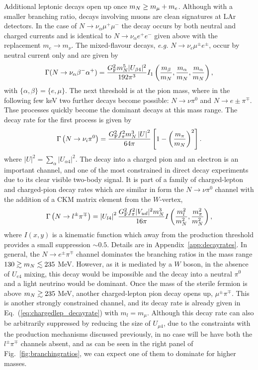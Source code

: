 \documentclass[11pt, a4paper]{article}
\newcommand{\refeq}[1]{Eq.~(\ref{#1})}
\newcommand{\reffig}[1]{Fig.~\ref{#1}}
\newcommand{\refapp}[1]{Appendix~\ref{#1}}
\def\ster{\ensuremath N}
\begin{document}
Additional leptonic decays open up once $m_\ster \geq m_\mu+m_e$. Although with
a smaller branching ratio, decays involving muons are clean signatures at LAr
detectors. In the case of $N\rightarrow \nu_\alpha \mu^+ \mu^-$ the decay
occurs by both neutral and charged currents and is identical to $N\rightarrow
\nu_\alpha e^+ e^-$ given above with the replacement $m_e \rightarrow m_\nu$.
The mixed-flavour decays, \emph{e.g.} $N\rightarrow \nu_e \mu^\pm e^\pm$, occur
by neutral current only and are given by 
%
\[ \Gamma(\ster\to\nu_{\alpha} \beta^- \alpha^+) = \frac{G_\text{F}^2m_\ster^5
|U_{\beta 4}|^2}{192 \pi^3} I_1\left(\frac{m_\beta}{m_N},\frac{ m_\alpha}{m_N},
\frac{ m_\alpha}{m_N} \right) , \] 
%
with $\{\alpha,\beta\} = \{e, \mu\}$. The next threshold is at the pion mass,
where in the following few keV two further decays become possible: $N\to\nu
\pi^0$ and $N\to e\pm\pi^\mp$. Thse processes quickly become the dominant
decays at this mass range. 
%
The decay rate for the first process is given by
%
\[ \Gamma\left(\ster \to \nu_i \pi^0\right) =
\frac{G_\text{F}^2f_\pi^2m_\ster^3\left|U\right|^2}{64\pi} \left[1-\left(
\frac{m_\pi}{m_\ster} \right)^2\right].  \]
%
where $\left|U\right|^2 = \sum_{\alpha}\left|U_{\alpha 4}\right|^2$.
%
The decay into a charged pion and an electron is an important channel, and one
of the most constrained in direct decay experiments due to its clear visible
two-body signal.  It is part of a family of charged-lepton and charged-pion
decay rates which are similar in form the $N\to \nu \pi^0$ channel with the
addition of a CKM matrix element from the $W$-vertex,
%
\begin{align} \Gamma\left(\ster\to l^\pm\pi^\mp\right) =
\left|U_{l4}\right|^2\frac{G_\text{F}^2f_\pi^2 |V_{ud}|^2
m_\ster^3}{16\pi}I\left(\frac{m_l^2}{m_\ster^2} ,
\frac{m_\pi^2}{m_\ster^2}\right) , \label{eq:chargedlep_decayrate}\end{align}
%
where $I(x,y)$ is a kinematic function which away from the production threshold
provides a small suppression $\sim 0.5$. Details are in
\refapp{app:decayrates}.
%
In general, the $N\to e^\pm\pi^\mp$ channel dominates the branching ratios in
the mass range $130 \gtrsim m_\ster \lesssim 235$ MeV. However, as it is
mediated by a $W$ boson, in the absence of $U_{e4}$ mixing, this decay would be
impossible and the decay into a neutral $\pi^0$ and a light neutrino would be
dominant. Once the mass of the sterile fermion is above $m_\ster \gtrsim 235$
MeV, another charged-lepton pion decay opens up, $\mu^\pm\pi^\mp$. This is
another strongly constrained channel, and its decay rate is already given in
\refeq{eq:chargedlep_decayrate} with $m_l = m_\mu$. Although this decay rate
can also be arbitrarily suppressed by reducing the size of $U_{\mu 4}$, due to
the constraints with the production mechanisms discussed previously, in no case
will be have both the $l^\pm\pi^\mp$ channels absent, and as can be seen in the
right panel of \reffig{fig:branchingratios}, we can expect one of them to
dominate for higher masses.
\end{document}
